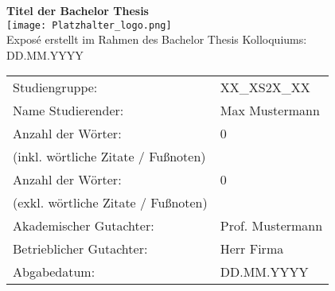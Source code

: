 \documentclass[a4paper,12pt]{scrartcl}
\newcommand{\documentTitle}[1]{{\fontsize{20pt}{24pt}\selectfont\textbf{\color{ba-blau}#1}}}
\begin{document}
\thispagestyle{Deckblatt}

\begin{center}
    \documentTitle {Titel der Bachelor Thesis} \\[3ex]
    \texttt{[image: Platzhalter\_logo.png]} \\[3ex]
    \large{Exposé erstellt im Rahmen des Bachelor Thesis Kolloquiums:
    } \\
    \large{DD.MM.YYYY}
\end{center}

\renewcommand{\arraystretch}{2.5}
\begin{table}[h]
    \setlength{\tabcolsep}{32pt}
    \begin{tabularx}{\textwidth}{l l}
        Studiengruppe:                      & XX\_XS2X\_XX     \\
        Name Studierender:                  & Max Mustermann   \\
        Anzahl der Wörter:                  & 0                \\ [-15pt]
        (inkl. wörtliche Zitate / Fußnoten) & ~                \\
        Anzahl der Wörter:                  & 0                \\ [-15pt]
        (exkl. wörtliche Zitate / Fußnoten) & ~                \\
        Akademischer Gutachter:             & Prof. Mustermann \\
        Betrieblicher Gutachter:            & Herr Firma       \\
        Abgabedatum:                        & DD.MM.YYYY       \\
    \end{tabularx}
\end{table}

\newpage

\pagestyle{defaultPageStyle}



\setcounter{page}{1}

\tableofcontents
\newpage
\listoffigures
\newpage
\listoftables
\newpage


\setcounter{preamblecounterstate}{\value{page}}







\newpage

\setcounter{page}{\value{preamblecounterstate}}

\printbibliography[title={Literaturverzeichnis}]
\end{document}

